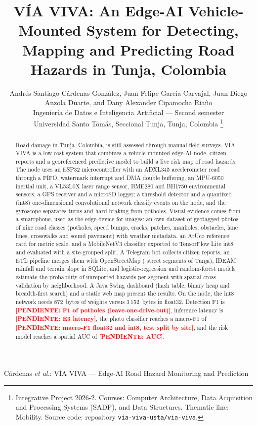 \documentclass[journal,10pt]{IEEEtran}
\newcommand{\pendiente}[1]{\textcolor{red}{\textbf{[PENDIENTE: #1]}}}
\begin{document}
\title{V\'IA VIVA: An Edge-AI Vehicle-Mounted System for Detecting, Mapping and Predicting Road Hazards in Tunja, Colombia}

\author{Andr\'es Santiago C\'ardenas Gonz\'alez, Juan Felipe Garc\'ia Carvajal, Juan Diego Anzola Duarte, and Dany Alexander Cipamocha Ria\~no\\[0.3em]
\small Ingenier\'ia de Datos e Inteligencia Artificial --- Second semester\\
\small Universidad Santo Tom\'as, Seccional Tunja, Tunja, Colombia%
\thanks{Integrative Project 2026-2. Courses: Computer Architecture, Data Acquisition and Processing Systems (SADP), and Data Structures. Thematic line: Mobility. Source code: repository \texttt{via-viva-usta/via-viva}.}}

%
{C\'ardenas \MakeLowercase{\textit{et al.}}: V\'IA VIVA --- Edge-AI Road Hazard Monitoring and Prediction}

\maketitle

\begin{abstract}
Road damage in Tunja, Colombia, is still assessed through manual field surveys. V\'IA VIVA is a low-cost system that combines a vehicle-mounted edge-AI node, citizen reports and a georeferenced predictive model to build a live risk map of road hazards. The node uses an ESP32 microcontroller with an ADXL345 accelerometer read through a FIFO, watermark interrupt and DMA double buffering, an MPU-6050 inertial unit, a VL53L0X laser range sensor, BME280 and BH1750 environmental sensors, a GPS receiver and a microSD logger; a threshold detector and a quantized (int8) one-dimensional convolutional network classify events on the node, and the gyroscope separates turns and hard braking from potholes. Visual evidence comes from a smartphone, used as the edge device for images: an own dataset of geotagged photos of nine road classes (potholes, speed bumps, cracks, patches, manholes, obstacles, lane lines, crosswalks and sound pavement) with weather metadata, an ArUco reference card for metric scale, and a MobileNetV3 classifier exported to TensorFlow Lite int8 and evaluated with a site-grouped split. A Telegram bot collects citizen reports, an ETL pipeline merges them with OpenStreetMap (\NTramos{} street segments of Tunja), IDEAM rainfall and terrain slope in SQLite, and logistic-regression and random-forest models estimate the probability of unreported hazards per segment with spatial cross-validation by neighborhood. A Java Swing dashboard (hash table, binary heap and breadth-first search) and a static web map present the results. On the node, the int8 network needs 872~bytes of weights versus 3\,152~bytes in float32. Detection F1 is \pendiente{F1 of potholes (leave-one-drive-out)}, inference latency is \pendiente{E3 latency}, the photo classifier reaches a macro-F1 of \pendiente{macro-F1 float32 and int8, test split by site}, and the risk model reaches a spatial AUC of \pendiente{AUC}.
\end{abstract}
\end{document}
